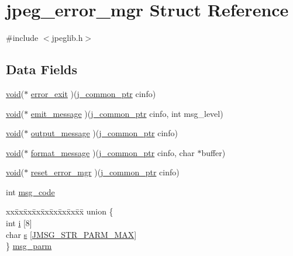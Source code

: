 \hypertarget{structjpeg__error__mgr}{}\section{jpeg\+\_\+error\+\_\+mgr Struct Reference}
\label{structjpeg__error__mgr}


{\ttfamily \#include $<$jpeglib.\+h$>$}

\subsection*{Data Fields}
\begin{DoxyCompactItemize}
\item 
\hyperlink{png_8h_ac9c84fa68bbad002983e35ce3663c686}{void}($\ast$ \hyperlink{structjpeg__error__mgr_aebcba526d672e824d5545b3eb07f881c}{error\+\_\+exit} )(\hyperlink{jpeglib_8h_a1a177ab705cefea8f30ec31a48e62650}{j\+\_\+common\+\_\+ptr} cinfo)
\item 
\hyperlink{png_8h_ac9c84fa68bbad002983e35ce3663c686}{void}($\ast$ \hyperlink{structjpeg__error__mgr_ad1191212cf09f30ce06a648b04160790}{emit\+\_\+message} )(\hyperlink{jpeglib_8h_a1a177ab705cefea8f30ec31a48e62650}{j\+\_\+common\+\_\+ptr} cinfo, int msg\+\_\+level)
\item 
\hyperlink{png_8h_ac9c84fa68bbad002983e35ce3663c686}{void}($\ast$ \hyperlink{structjpeg__error__mgr_abf5edd8e548e0b65dcee9ce26a7a330c}{output\+\_\+message} )(\hyperlink{jpeglib_8h_a1a177ab705cefea8f30ec31a48e62650}{j\+\_\+common\+\_\+ptr} cinfo)
\item 
\hyperlink{png_8h_ac9c84fa68bbad002983e35ce3663c686}{void}($\ast$ \hyperlink{structjpeg__error__mgr_a5a42a63579855f682ff619a88ecdc705}{format\+\_\+message} )(\hyperlink{jpeglib_8h_a1a177ab705cefea8f30ec31a48e62650}{j\+\_\+common\+\_\+ptr} cinfo, char $\ast$buffer)
\item 
\hyperlink{png_8h_ac9c84fa68bbad002983e35ce3663c686}{void}($\ast$ \hyperlink{structjpeg__error__mgr_a0260c7b8f7ef606f24716affacf98515}{reset\+\_\+error\+\_\+mgr} )(\hyperlink{jpeglib_8h_a1a177ab705cefea8f30ec31a48e62650}{j\+\_\+common\+\_\+ptr} cinfo)
\item 
int \hyperlink{structjpeg__error__mgr_a27fcf9391530acf9075836c5d11fff00}{msg\+\_\+code}
\item 
\begin{tabbing}
xx\=xx\=xx\=xx\=xx\=xx\=xx\=xx\=xx\=\kill
union \{\\
\>int \hyperlink{structjpeg__error__mgr_a9b91e1ea3b7e8af8d37cb712a72f4597}{i} \mbox{[}8\mbox{]}\\
\>char \hyperlink{structjpeg__error__mgr_a0b335f0919d328a95f02440a4ec2216b}{s} \mbox{[}\hyperlink{jpeglib_8h_abda041041041cc3985c7bb1a32e8b0be}{JMSG\_STR\_PARM\_MAX}\mbox{]}\\
\} \hyperlink{structjpeg__error__mgr_a597816f5aeb65ac65c37616273644db9}{msg\_parm}\\


\end{tabbing}
\end{DoxyCompactItemize}
